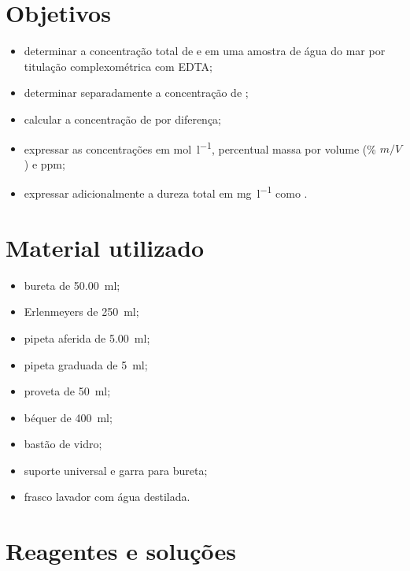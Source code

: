 \documentclass[a4paper,12pt]{article}
\begin{document}
\section{Objetivos}

\begin{itemize}
  \item determinar a concentração total de  e  em uma
        amostra de água do mar por titulação complexométrica com EDTA;
  \item determinar separadamente a concentração de ;
  \item calcular a concentração de  por diferença;
  \item expressar as concentrações em \si{\mole\per\litre}, percentual
        massa por volume (\% $m/V$) e ppm;
  \item expressar adicionalmente a dureza total em
        \si{\milli\gram\per\litre} como .
\end{itemize}

\section{Material utilizado}

\begin{itemize}
  \item bureta de \qty{50.00}{\milli\litre};
  \item Erlenmeyers de \qty{250}{\milli\litre};
  \item pipeta aferida de \qty{5.00}{\milli\litre};
  \item pipeta graduada de \qty{5}{\milli\litre};
  \item proveta de \qty{50}{\milli\litre};
  \item béquer de \qty{400}{\milli\litre};
  \item bastão de vidro;
  \item suporte universal e garra para bureta;
  \item frasco lavador com água destilada.
\end{itemize}

\section{Reagentes e soluções}
\end{document}
